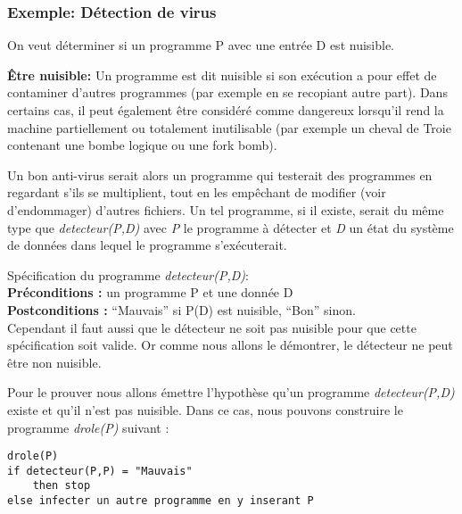 
\subsubsection{Exemple: Détection de virus}
\label{subsubsec:detection_de_virus}
On veut déterminer si un programme P avec une entrée D est nuisible.

\textbf{Être nuisible:} Un programme est dit nuisible si son exécution a pour effet de contaminer d'autres programmes (par exemple en se recopiant autre part). Dans certains cas, il peut également être considéré comme dangereux lorsqu'il rend la machine partiellement ou totalement inutilisable (par exemple un cheval de Troie contenant une bombe logique ou une fork bomb).

Un bon anti-virus serait alors un programme qui testerait des programmes en regardant s'ils se multiplient, tout en les empêchant de modifier (voir d'endommager) d'autres fichiers. Un tel programme, si il existe, serait du même type que \textit{detecteur(P,D)} avec \textit{P} le programme à détecter et \textit{D} un état du système de données dans lequel le programme s'exécuterait.

Spécification du programme \textit{detecteur(P,D)}:\\
\textbf{Préconditions :} un programme P et une donnée D\\
\textbf{Postconditions :} ``Mauvais'' si P(D) est nuisible,
		``Bon'' sinon.\\
		
Cependant il faut aussi que le détecteur ne soit pas nuisible pour que cette spécification soit valide. Or comme nous allons le démontrer, le détecteur ne peut être non nuisible.

Pour le prouver nous allons émettre l'hypothèse qu'un programme \textit{detecteur(P,D)} existe et qu'il n'est pas nuisible.  Dans ce cas, nous pouvons construire le programme \textit{drole(P)} suivant :

\label{lst:detecteur_de_virus}
\begin{lstlisting}
drole(P)
if detecteur(P,P) = "Mauvais"
	then stop
else infecter un autre programme en y inserant P
\end{lstlisting}

